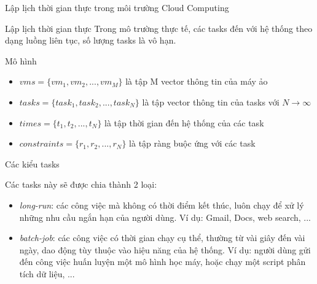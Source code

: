 \documentclass[11pt,xcolor={dvipsnames}, aspectratio=169]{beamer}
\begin{document}
\begin{frame}
{Lập lịch thời gian thực trong môi trường Cloud Computing}

\begin{block}
{Lập lịch thời gian thực}
Trong mô trường thực tế, các tasks đến với hệ thống theo dạng luồng liên tục, số lượng tasks là vô hạn. 
\end{block}

\begin{block}
{Mô hình}
\begin{itemize}
	\item $vms = \{vm_{1}, vm_{2}, ..., vm_{M}\}$ là tập M vector thông tin của máy ảo
	\item $tasks = \{task_{1}, task_{2}, ..., task_{N}\}$ là tập vector thông tin của tasks với $N \to \infty$
	\item $times = \{t_{1}, t_{2}, ..., t_{N}\}$ là tập thời gian đến hệ thống của các task 
	\item $constraints = \{r_{1}, r_{2}, ..., r_{N}\}$ là tập ràng buộc ứng với các task 
\end{itemize}
\end{block}
\end{frame}

\begin{frame}
{Các kiểu tasks}


\begin{block}
{Các tasks này sẽ được chia thành 2 loại: }
\begin{itemize}
	\item \textit{long-run}: các công việc mà không có thời điểm kết thúc, luôn chạy để xử lý những nhu cầu ngắn hạn của người dùng. Ví dụ: Gmail, Docs, web search, ...
	\item \textit{batch-job}: các công việc có thời gian chạy cụ thể, thường từ vài giây đến vài ngày, dao động tùy thuộc vào hiệu năng của hệ thống. Ví dụ: người dùng gửi đến công việc huấn luyện một mô hình học máy, hoặc chạy một script phân tích dữ liệu, ... 
\end{itemize}
\end{block}
\end{frame}
\end{document}
